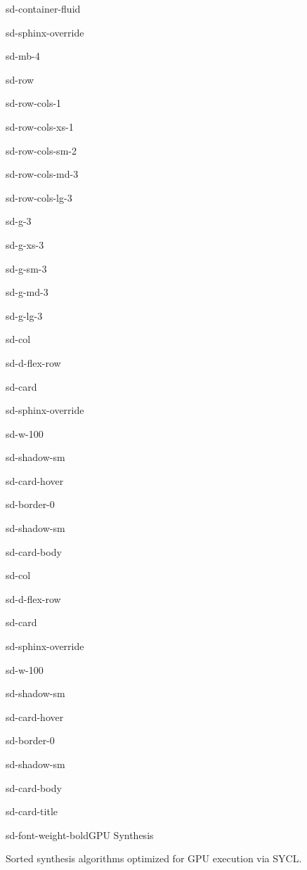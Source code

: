 \documentclass[a4paper,10pt,english]{sphinxmanual}
\begin{document}
\begin{sphinxuseclass}{sd-container-fluid}
\begin{sphinxuseclass}{sd-sphinx-override}
\begin{sphinxuseclass}{sd-mb-4}
\begin{sphinxuseclass}{sd-row}
\begin{sphinxuseclass}{sd-row-cols-1}
\begin{sphinxuseclass}{sd-row-cols-xs-1}
\begin{sphinxuseclass}{sd-row-cols-sm-2}
\begin{sphinxuseclass}{sd-row-cols-md-3}
\begin{sphinxuseclass}{sd-row-cols-lg-3}
\begin{sphinxuseclass}{sd-g-3}
\begin{sphinxuseclass}{sd-g-xs-3}
\begin{sphinxuseclass}{sd-g-sm-3}
\begin{sphinxuseclass}{sd-g-md-3}
\begin{sphinxuseclass}{sd-g-lg-3}
\begin{sphinxuseclass}{sd-col}
\begin{sphinxuseclass}{sd-d-flex-row}
\begin{sphinxuseclass}{sd-card}
\begin{sphinxuseclass}{sd-sphinx-override}
\begin{sphinxuseclass}{sd-w-100}
\begin{sphinxuseclass}{sd-shadow-sm}
\begin{sphinxuseclass}{sd-card-hover}
\begin{sphinxuseclass}{sd-border-0}
\begin{sphinxuseclass}{sd-shadow-sm}
\begin{sphinxuseclass}{sd-card-body}
\end{sphinxuseclass}{\hyperref[\detokenize{api/imdp::doc}]{}}
\end{sphinxuseclass}
\end{sphinxuseclass}
\end{sphinxuseclass}
\end{sphinxuseclass}
\end{sphinxuseclass}
\end{sphinxuseclass}
\end{sphinxuseclass}
\end{sphinxuseclass}
\end{sphinxuseclass}
\begin{sphinxuseclass}{sd-col}
\begin{sphinxuseclass}{sd-d-flex-row}
\begin{sphinxuseclass}{sd-card}
\begin{sphinxuseclass}{sd-sphinx-override}
\begin{sphinxuseclass}{sd-w-100}
\begin{sphinxuseclass}{sd-shadow-sm}
\begin{sphinxuseclass}{sd-card-hover}
\begin{sphinxuseclass}{sd-border-0}
\begin{sphinxuseclass}{sd-shadow-sm}
\begin{sphinxuseclass}{sd-card-body}
\begin{sphinxuseclass}{sd-card-title}
\begin{sphinxuseclass}{sd-font-weight-bold}GPU Synthesis
\end{sphinxuseclass}
\end{sphinxuseclass}
\sphinxAtStartPar
Sorted synthesis algorithms optimized for GPU execution via SYCL.


\end{sphinxuseclass}
\end{sphinxuseclass}
\end{sphinxuseclass}
\end{sphinxuseclass}
\end{sphinxuseclass}
\end{sphinxuseclass}
\end{sphinxuseclass}
\end{sphinxuseclass}
\end{sphinxuseclass}
\end{sphinxuseclass}
\end{sphinxuseclass}
\end{sphinxuseclass}
\end{sphinxuseclass}
\end{sphinxuseclass}
\end{sphinxuseclass}
\end{sphinxuseclass}
\end{sphinxuseclass}
\end{sphinxuseclass}
\end{sphinxuseclass}
\end{sphinxuseclass}
\end{sphinxuseclass}
\end{sphinxuseclass}
\end{sphinxuseclass}
\end{sphinxuseclass}
\end{document}
